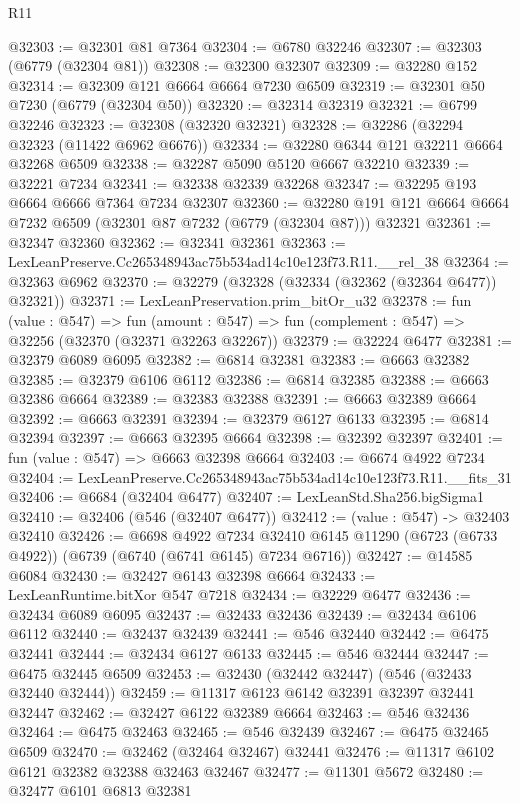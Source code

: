 \begin{lexlean}{R11}
\begin{coremodule}
@32303 := @32301 @81 @7364
@32304 := @6780 @32246
@32307 := @32303 (@6779 (@32304 @81))
@32308 := @32300 @32307
@32309 := @32280 @152
@32314 := @32309 @121 @6664 @6664 @7230 @6509
@32319 := @32301 @50 @7230 (@6779 (@32304 @50))
@32320 := @32314 @32319
@32321 := @6799 @32246
@32323 := @32308 (@32320 @32321)
@32328 := @32286 (@32294 @32323 (@11422 @6962 @6676))
@32334 := @32280 @6344 @121 @32211 @6664 @32268 @6509
@32338 := @32287 @5090 @5120 @6667 @32210
@32339 := @32221 @7234
@32341 := @32338 @32339 @32268
@32347 := @32295 @193 @6664 @6666 @7364 @7234 @32307
@32360 := @32280 @191 @121 @6664 @6664 @7232 @6509 (@32301 @87 @7232 (@6779 (@32304 @87))) @32321
@32361 := @32347 @32360
@32362 := @32341 @32361
@32363 := LexLeanPreserve.Cc265348943ac75b534ad14c10e123f73.R11.__rel_38
@32364 := @32363 @6962
@32370 := @32279 (@32328 (@32334 (@32362 (@32364 @6477)) @32321))
@32371 := LexLeanPreservation.prim_bitOr_u32
@32378 := fun (value : @547) =>
  fun (amount : @547) => fun (complement : @547) => @32256 (@32370 (@32371 @32263 @32267))
@32379 := @32224 @6477
@32381 := @32379 @6089 @6095
@32382 := @6814 @32381
@32383 := @6663 @32382
@32385 := @32379 @6106 @6112
@32386 := @6814 @32385
@32388 := @6663 @32386 @6664
@32389 := @32383 @32388
@32391 := @6663 @32389 @6664
@32392 := @6663 @32391
@32394 := @32379 @6127 @6133
@32395 := @6814 @32394
@32397 := @6663 @32395 @6664
@32398 := @32392 @32397
@32401 := fun (value : @547) => @6663 @32398 @6664
@32403 := @6674 @4922 @7234
@32404 := LexLeanPreserve.Cc265348943ac75b534ad14c10e123f73.R11.__fits_31
@32406 := @6684 (@32404 @6477)
@32407 := LexLeanStd.Sha256.bigSigma1
@32410 := @32406 (@546 (@32407 @6477))
@32412 := (value : @547) -> @32403 @32410
@32426 := @6698
    @4922
    @7234
    @32410
    @6145
    @11290
    (@6723 (@6733 @4922))
    (@6739 (@6740 (@6741 @6145) @7234 @6716))
@32427 := @14585 @6084
@32430 := @32427 @6143 @32398 @6664
@32433 := LexLeanRuntime.bitXor @547 @7218
@32434 := @32229 @6477
@32436 := @32434 @6089 @6095
@32437 := @32433 @32436
@32439 := @32434 @6106 @6112
@32440 := @32437 @32439
@32441 := @546 @32440
@32442 := @6475 @32441
@32444 := @32434 @6127 @6133
@32445 := @546 @32444
@32447 := @6475 @32445 @6509
@32453 := @32430 (@32442 @32447) (@546 (@32433 @32440 @32444))
@32459 := @11317 @6123 @6142 @32391 @32397 @32441 @32447
@32462 := @32427 @6122 @32389 @6664
@32463 := @546 @32436
@32464 := @6475 @32463
@32465 := @546 @32439
@32467 := @6475 @32465 @6509
@32470 := @32462 (@32464 @32467) @32441
@32476 := @11317 @6102 @6121 @32382 @32388 @32463 @32467
@32477 := @11301 @5672
@32480 := @32477 @6101 @6813 @32381

\end{coremodule}
\end{lexlean}
